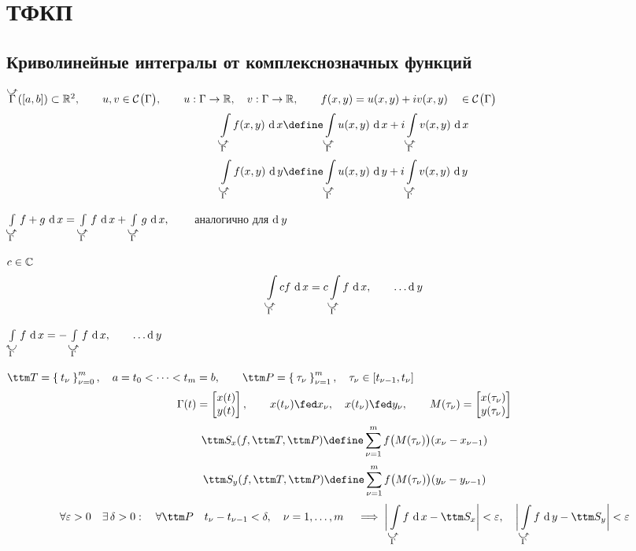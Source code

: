 \chapter{ТФКП}

\section{Криволинейные интегралы от комплекснозначных функций}

\begin{definition}
	$ \curvedir \Gamma([a, b]) \sub \R^2, \qquad u, v \in \Cont \Gamma, \qquad u : \Gamma \to \R, \quad v : \Gamma \to \R, \qquad f(x, y) = u(x, y) + iv(x, y) \quad \in \Cont \Gamma $
	$$ \cint[x]{\curvedir \Gamma}{f(x, y)} \define \cint[x]{\curvedir \Gamma}{u(x, y)} + i \cint[x]{\curvedir \Gamma}{v(x, y)} $$
	$$ \cint[y]{\curvedir \Gamma}{f(x, y)} \define \cint[y]{\curvedir \Gamma}{u(x, y)} + i \cint[y]{\curvedir \Gamma}{v(x, y)} $$
\end{definition}

\begin{props}
	\item $ \cint[x]{\curvedir \Gamma}{f + g} = \cint[x]{\curvedir \Gamma}f + \cint[x]{\curvedir \Gamma}g, \qquad $ аналогично для $ \operatorname{d}^{} y $
	\item $ c \in \mathbb{C} $
	$$ \cint[x]{\curvedir \Gamma}{cf} = c \cint[x]{\curvedir \Gamma}f, \qquad \dots \di y $$
	\item $ \cint[x]{\curvedir[0] \Gamma}f = - \cint[x]{\curvedir \Gamma}f, \qquad \dots \di y $
	\item $ \ttm T = \seqz[m]{t_\nu}\nu, \quad a = t_0 < \dots < t_m = b, \qquad \ttm P = \seq[m]{\tau_\nu}\nu, \quad \tau_\nu \in [t_{\nu - 1}, t_\nu] $
	$$ \Gamma(t) =
	\begin{bmatrix}
		x(t) \\
		y(t)
	\end{bmatrix}, \qquad x(t_\nu) \fed x_\nu, \quad x(t_\nu) \fed y_\nu, \qquad M(\tau_\nu) =
	\begin{bmatrix}
		x(\tau_\nu) \\
		y(\tau_\nu)
	\end{bmatrix} $$
	$$ \ttm S_x(f, \ttm T, \ttm P) \define \sum_{\nu = 1}^m f \big( M(\tau_\nu) \big) (x_\nu - x_{\nu - 1}) $$
	$$ \ttm S_y(f, \ttm T, \ttm P) \define \sum_{\nu = 1}^m f \big( M(\tau_\nu) \big) (y_\nu - y_{\nu - 1}) $$
	$$ \forall \veps > 0 \quad \exist \delta > 0 : \quad \forall \ttm P \quad t_\nu - t_{\nu - 1} < \delta, \quad \nu = 1, \dots, m \quad \implies \bigg| \cint[x]{\curvedir\Gamma}f - \ttm S_x \bigg| < \veps, \quad \bigg| \cint[y]{\curvedir\Gamma}f - \ttm S_y \bigg| < \veps $$
\end{props}

